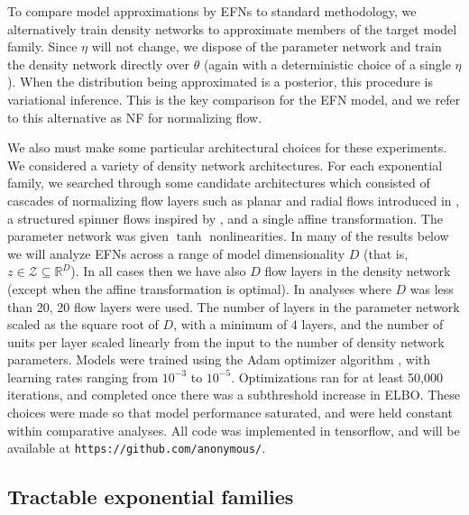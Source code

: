 \documentclass[twoside]{article}
\begin{document}
To compare model approximations by EFNs to standard methodology, we alternatively train density networks to approximate members of the target model family.  Since $\eta$ will not change, we dispose of the parameter network and train the density network directly over $\theta$ (again with a deterministic choice of a single $\eta$).  When the distribution being approximated is a posterior, this procedure is variational inference.  This is the key comparison for the EFN model, and we refer to this alternative as NF for normalizing flow.

We also must make some particular architectural choices for these experiments.  
We considered a variety of density network architectures.  For each exponential family, we searched through some candidate architectures which consisted of cascades of normalizing flow layers such as planar and radial flows introduced in \citep{rezende2015variational}, a structured spinner flows inspired by \citep{ bojarski2016structured}, and a single affine transformation.
The parameter network was given $\tanh$ nonlinearities. 
In many of the results below we will analyze EFNs across a range of model dimensionality $D$ (that is, $z \in \mathcal{Z} \subseteq \mathbb{R}^D$).    In all cases then we have also $D$ flow layers in the density network (except when the affine transformation is optimal).  In analyses where $D$ was less than 20, 20 flow layers were used.  The number of layers in the parameter network scaled as the square root of $D$, with a minimum of 4 layers, and the number of units per layer scaled linearly from the input to the number of density network parameters. Models were trained using the Adam optimizer algorithm \citep{kingma2014adam}, with learning rates ranging from $10^{-3}$ to $10^{-5}$.  Optimizations ran for at least 50,000 iterations, and completed once there was a subthreshold increase in ELBO. These choices were made so that model performance saturated, and were held constant within comparative analyses.
All code was implemented in tensorflow, and will be available at {\tt https://github.com/anonymous/}.







\subsection{Tractable exponential families}
\end{document}
